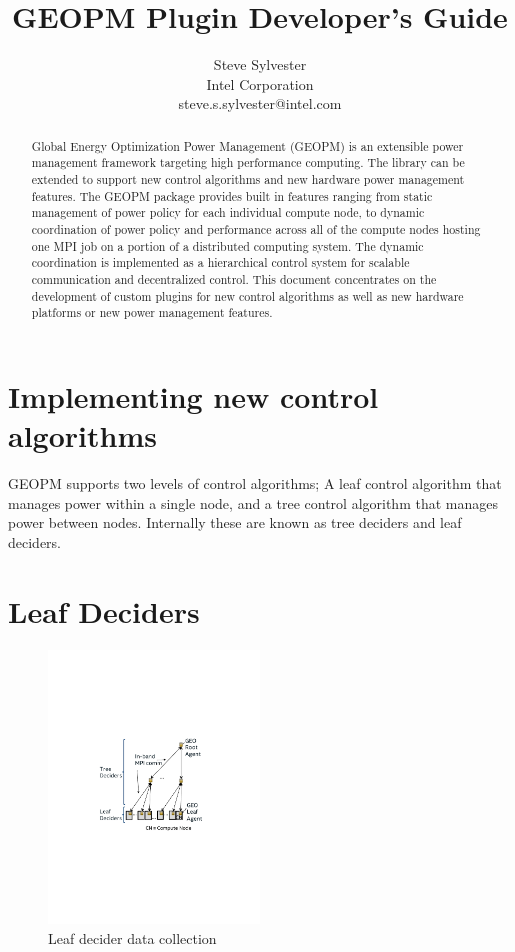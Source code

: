 \documentclass[11pt]{article}
\begin{document}
\sloppy
\title{GEOPM Plugin Developer's Guide}
\author{Steve Sylvester\\
        Intel Corporation\\
        \small{steve.s.sylvester@intel.com}}
\maketitle
\begin{abstract}
Global Energy Optimization Power Management (GEOPM) is an extensible
power management framework targeting high performance computing. The
library can be extended to support new control algorithms and new
hardware power management features. The GEOPM package provides built
in features ranging from static management of power policy for each
individual compute node, to dynamic coordination of power policy and
performance across all of the compute nodes hosting one MPI job on a
portion of a distributed computing system. The dynamic coordination is
implemented as a hierarchical control system for scalable
communication and decentralized control. This document concentrates on
the development of custom plugins for new control algorithms as well
as new hardware platforms or new power management features.
\end{abstract}

\section{Implementing new control algorithms}
\noindent
GEOPM supports two levels of control algorithms; A leaf control
algorithm that manages power within a single node, and a tree control
algorithm that manages power between nodes. Internally these are known
as tree deciders and leaf deciders.

\section{Leaf Deciders}
\begin{figure} [H]
  \centering
  \includegraphics[width=0.5\textwidth]{leaf-figure}
  \caption{Leaf decider data collection}
  \label{fig:leaf}
\end{figure}
\end{document}
